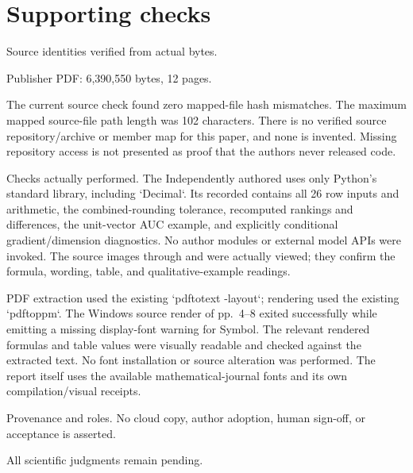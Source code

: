 \documentclass[10pt]{article}
\begin{document}
\section*{Supporting checks}
Source identities verified from actual bytes.\par
Publisher PDF: 6,390,550 bytes, 12 pages.\par
The current source check found zero mapped-file hash mismatches. The maximum mapped source-file path length was 102 characters. There is no verified source repository/archive or member map for this paper, and none is invented. Missing repository access is not presented as proof that the authors never released code.\par
Checks actually performed. The Independently authored uses only Python’s standard library, including `Decimal`. Its recorded contains all 26 row inputs and arithmetic, the combined-rounding tolerance, recomputed rankings and differences, the unit-vector AUC example, and explicitly conditional gradient/dimension diagnostics. No author modules or external model APIs were invoked. The source images through and were actually viewed; they confirm the formula, wording, table, and qualitative-example readings.\par
PDF extraction used the existing `pdftotext -layout`; rendering used the existing `pdftoppm`. The Windows source render of pp. 4–8 exited successfully while emitting a missing display-font warning for Symbol. The relevant rendered formulas and table values were visually readable and checked against the extracted text. No font installation or source alteration was performed. The report itself uses the available mathematical-journal fonts and its own compilation/visual receipts.\par
Provenance and roles. No cloud copy, author adoption, human sign-off, or acceptance is asserted.\par
All scientific judgments remain pending.\par
\end{document}
